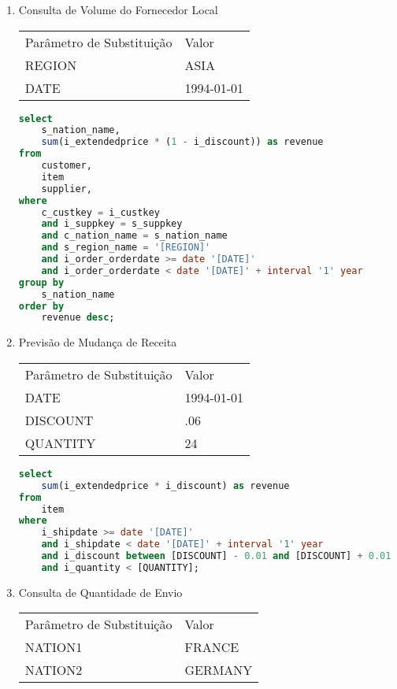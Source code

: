 \begin{enumerate}
\item Consulta de Volume do Fornecedor Local
	
	\begin{tabular}{ll}
	Parâmetro de Substituição & Valor\\
	REGION & ASIA\\
	DATE & 1994-01-01\\
\end{tabular}

	\begin{lstlisting}[language=SQL]
select
	s_nation_name,
	sum(i_extendedprice * (1 - i_discount)) as revenue
from
	customer,
	item
	supplier,
where
	c_custkey = i_custkey
	and i_suppkey = s_suppkey
	and c_nation_name = s_nation_name
	and s_region_name = '[REGION]'
	and i_order_orderdate >= date '[DATE]'
	and i_order_orderdate < date '[DATE]' + interval '1' year
group by
	s_nation_name
order by
	revenue desc;
	\end{lstlisting}
	
\item Previsão de Mudança de Receita

\begin{tabular}{ll}
	Parâmetro de Substituição & Valor\\
	DATE & 1994-01-01\\
	DISCOUNT & .06\\
	QUANTITY & 24\\
\end{tabular}

	\begin{lstlisting}[language=SQL]
select
	sum(i_extendedprice * i_discount) as revenue
from
	item
where
	i_shipdate >= date '[DATE]'
	and i_shipdate < date '[DATE]' + interval '1' year
	and i_discount between [DISCOUNT] - 0.01 and [DISCOUNT] + 0.01
	and i_quantity < [QUANTITY];
	\end{lstlisting}
	
\item Consulta de Quantidade de Envio

\begin{tabular}{ll}
	Parâmetro de Substituição & Valor\\
	NATION1 & FRANCE\\
	NATION2 & GERMANY\\
\end{tabular}


\end{enumerate}
